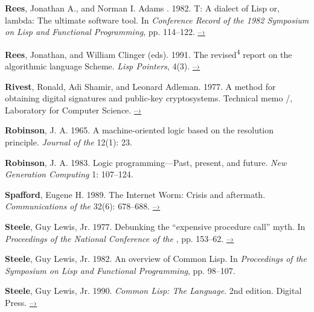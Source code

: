  \label{Rees and Adams 1982}
\textbf{Rees}, Jonathan A., and Norman I. Adams . 1982.  T: A dialect of Lisp or,
lambda: The ultimate software tool.  In \textit{Conference Record of the 1982
 Symposium on Lisp and Functional Programming}, pp.  114--122.
\href{http://people.csail.mit.edu/riastradh/t/adams82t.pdf}{–›}

\textbf{Rees}, Jonathan, and William Clinger (eds). 1991.  The revised\textsuperscript{4} report on the algorithmic language Scheme.  \textit{Lisp Pointers}, 4(3).
\href{http://people.csail.mit.edu/jaffer/r4rs.pdf}{–›}

 \label{Rivest et al. (1977)}
\textbf{Rivest}, Ronald, Adi Shamir, and Leonard Adleman.  1977.  A method for obtaining
digital signatures and public-key cryptosystems. Technical memo /,
 Laboratory for Computer Science.
\href{http://people.csail.mit.edu/rivest/Rsapaper.pdf}{–›}

 \label{Robinson 1965}
\textbf{Robinson}, J. A. 1965.  A machine-oriented logic based on the resolution
principle.  \textit{Journal of the } 12(1): 23.

 \label{Robinson 1983}
\textbf{Robinson}, J. A. 1983.  Logic programming---Past, present, and future.
\textit{New Generation Computing} 1: 107--124.

 \label{Spafford 1989}
\textbf{Spafford}, Eugene H.  1989.  The Internet Worm: Crisis and aftermath.
\textit{Communications of the } 32(6): 678--688.
\href{http://citeseerx.ist.psu.edu/viewdoc/download?doi=10.1.1.123.8503&rep=rep1&type=pdf}{–›}

 \label{Steele 1977}
\textbf{Steele}, Guy Lewis, Jr.  1977.  Debunking the “expensive procedure call” myth.
In \textit{Proceedings of the National Conference of the },
pp. 153--62.
\href{http://dspace.mit.edu/handle/1721.1/5753}{–›}

\pagebreak

 \label{Steele 1982}
\textbf{Steele}, Guy Lewis, Jr.  1982.  An overview of Common Lisp.  In
\textit{Proceedings of the  Symposium on Lisp and Functional
Programming}, pp. 98--107.

 \label{Steele 1990}
\textbf{Steele}, Guy Lewis, Jr.  1990.  \textit{Common Lisp: The Language}. 2nd edition.
Digital Press.
\href{http://www.cs.cmu.edu/Groups/AI/html/cltl/cltl2.html}{–›}

